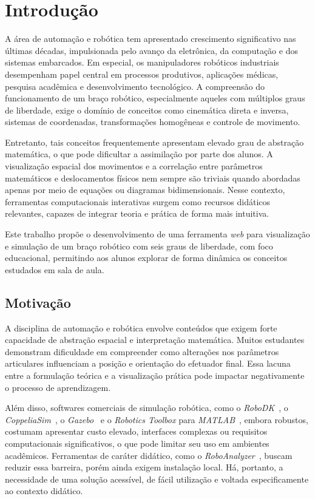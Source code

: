 \chapter{Introdução}

A área de automação e robótica tem apresentado crescimento significativo nas últimas décadas, impulsionada pelo avanço da eletrônica, da computação e dos sistemas embarcados. Em especial, os manipuladores robóticos industriais desempenham papel central em processos produtivos, aplicações médicas, pesquisa acadêmica e desenvolvimento tecnológico. A compreensão do funcionamento de um braço robótico, especialmente aqueles com múltiplos graus de liberdade, exige o domínio de conceitos como cinemática direta e inversa, sistemas de coordenadas, transformações homogêneas e controle de movimento.

Entretanto, tais conceitos frequentemente apresentam elevado grau de abstração matemática, o que pode dificultar a assimilação por parte dos alunos. A visualização espacial dos movimentos e a correlação entre parâmetros matemáticos e deslocamentos físicos nem sempre são triviais quando abordadas apenas por meio de equações ou diagramas bidimensionais. Nesse contexto, ferramentas computacionais interativas surgem como recursos didáticos relevantes, capazes de integrar teoria e prática de forma mais intuitiva.

Este trabalho propõe o desenvolvimento de uma ferramenta \textit{web} para visualização e simulação de um braço robótico com seis graus de liberdade, com foco educacional, permitindo aos alunos explorar de forma dinâmica os conceitos estudados em sala de aula.

\section{Motivação}

A disciplina de automação e robótica envolve conteúdos que exigem forte capacidade de abstração espacial e interpretação matemática. Muitos estudantes demonstram dificuldade em compreender como alterações nos parâmetros articulares influenciam a posição e orientação do efetuador final. Essa lacuna entre a formulação teórica e a visualização prática pode impactar negativamente o processo de aprendizagem.

Além disso, softwares comerciais de simulação robótica, como o \textit{RoboDK}~\cite{robodk}, o \textit{CoppeliaSim}~\cite{coppeliasim}, o \textit{Gazebo}~\cite{gazebo2004} e o \textit{Robotics Toolbox} para \textit{MATLAB}~\cite{corke2011toolbox}, embora robustos, costumam apresentar custo elevado, interfaces complexas ou requisitos computacionais significativos, o que pode limitar seu uso em ambientes acadêmicos. Ferramentas de caráter didático, como o \textit{RoboAnalyzer}~\cite{roboanalyzer}, buscam reduzir essa barreira, porém ainda exigem instalação local. Há, portanto, a necessidade de uma solução acessível, de fácil utilização e voltada especificamente ao contexto didático.


